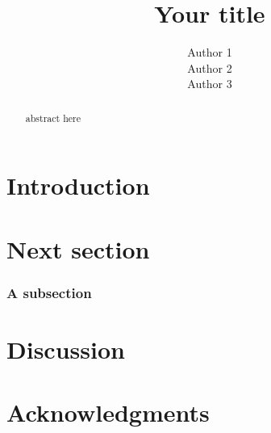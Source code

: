 \documentclass[12pt]{article}
\begin{document}
\author{Author 1 \\
Author 2\\
Author 3}

\title{Your title}

\maketitle

\begin{abstract}
abstract here
\end{abstract}


\section{Introduction}

\section{Next section}

\subsubsection{A subsection}

\section{Discussion}

\section*{Acknowledgments}

\newpage



\end{document}
